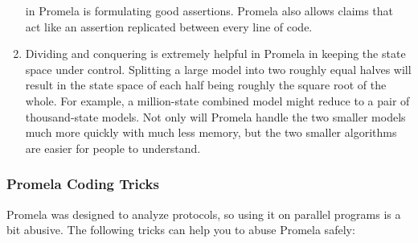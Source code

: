 \begin{enumerate}
	in Promela is formulating good assertions.
	Promela also allows  claims that act like an assertion
	replicated between every line of code.
\item	Dividing and conquering is extremely helpful in Promela in keeping
	the state space under control.
	Splitting a large model into two roughly equal halves will result
	in the state space of each half being roughly the square root of
	the whole.
	For example, a million-state combined model might reduce to a
	pair of thousand-state models.
	Not only will Promela handle the two smaller models much more
	quickly with much less memory, but the two smaller algorithms
	are easier for people to understand.
\end{enumerate}


\subsubsection{Promela Coding Tricks}
\label{sec:formal:Promela Coding Tricks}

Promela was designed to analyze protocols, so using it on parallel programs
is a bit abusive.
The following tricks can help you to abuse Promela safely:

